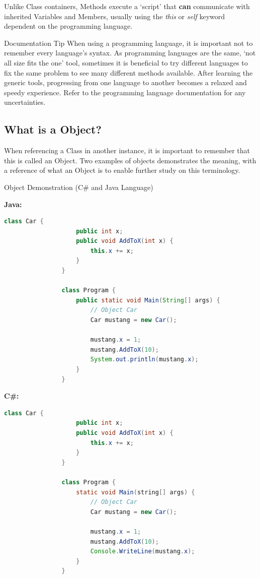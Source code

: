 \documentclass[10pt]{article}
\begin{document}
        Unlike Class containers, Methods execute a `script' that \textbf{can} communicate with inherited Variables and Members, usually using the \textit{this} or \textit{self} keyword dependent on the programming language.

        \begin{tip}{Documentation Tip}
            When using a programming language, it is important not to remember every language's syntax. As programming languages are the same, `not all size fits the one' tool, sometimes it is beneficial to try different languages to fix the same problem to see many different methods available. After learning the generic tools, progressing from one language to another becomes a relaxed and speedy experience. Refer to the programming language documentation for any uncertainties.
        \end{tip}

    \subsection{What is a Object?}
        When referencing a Class in another instance, it is important to remember that this is called an Object. Two examples of objects demonstrates the meaning, with a reference of what an Object is to enable further study on this terminology.

        \begin{example}{Object Demonstration (C\# and Java Language)}

            \textbf{Java:}
            \begin{lstlisting}[language=java]
                class Car {
                    public int x;
                    public void AddToX(int x) {
                        this.x += x;
                    }
                }

                class Program { 
                    public static void Main(String[] args) {
                        // Object Car 
                        Car mustang = new Car();

                        mustang.x = 1;
                        mustang.AddToX(10);
                        System.out.println(mustang.x);
                    }
                }
            \end{lstlisting}

            \textbf{C\#:}
            \begin{lstlisting}[language=java]
                class Car {
                    public int x;
                    public void AddToX(int x) {
                        this.x += x;
                    }
                }

                class Program { 
                    static void Main(string[] args) {
                        // Object Car 
                        Car mustang = new Car();
                
                        mustang.x = 1;
                        mustang.AddToX(10);
                        Console.WriteLine(mustang.x);
                    }
                }
            \end{lstlisting}
        \end{example}
\end{document}
